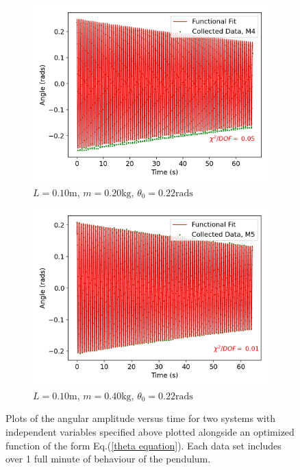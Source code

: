 \begin{figure}[H]
\centering
\begin{subfigure}[t]{0.5\textwidth}
  \centering
  \includegraphics[width=1\textwidth]{Plots/M4.png}
  \caption{\small{$L = 0.10\text{m}$, $m = 0.20\text{kg}$, $\theta_0 = 0.22\text{rads}$}}
  \label{M4}
\end{subfigure}%
\begin{subfigure}[t]{.5\textwidth}
  \centering
  \includegraphics[width=\textwidth]{Plots/M5.png}
  \caption{\small{$L = 0.10\text{m}$, $m = 0.40\text{kg}$, $\theta_0 = 0.22\text{rads}$}}
  \label{M5}
\end{subfigure}
\caption{\small{Plots of the angular amplitude versus time for two systems with independent variables specified above plotted alongside an optimized function of the form Eq.(\ref{theta equation}). Each data set includes over 1 full minute of behaviour of the pendulum.}}
\end{figure}


